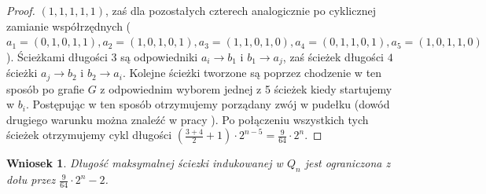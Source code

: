\documentclass{pracamgr}
\newtheorem{corollary}[theorem]{Wniosek}
\begin{document}
\begin{proof}
      $(1,1,1,1,1)$, zaś dla pozostałych czterech analogicznie po cyklicznej zamianie współrzędnych\newline
      ($a_1=(0,1,0,1,1),a_2=(1,0,1,0,1),a_3=(1,1,0,1,0),a_4=(0,1,1,0,1),a_5=(1,0,1,1,0)$).
      Ścieżkami długości $3$ są odpowiedniki $a_i\rightarrow b_1$ i $b_1\rightarrow a_j$, zaś ścieżek długości $4$ ścieżki
      $a_j\rightarrow b_2$ i $b_2\rightarrow a_i$. Kolejne ścieżki tworzone są poprzez chodzenie w ten sposób po grafie $G$ z odpowiednim
      wyborem jednej z 5 ścieżek kiedy startujemy w $b_i$.
      Postępując w ten sposób otrzymujemy porządany zwój w pudełku (dowód drugiego warunku można znaleźć w pracy \cite{Snake2}).
      Po połączeniu wszystkich tych ścieżek otrzymujemy cykl długości $(\frac{3+4}{2}+1)\cdot 2^{n-5}=\frac{9}{64}\cdot2^n$.
     \end{proof} 
     \begin{corollary}
      Długość maksymalnej ściezki indukowanej w $Q_n$ jest ograniczona z dołu przez $\frac{9}{64}\cdot 2^n-2$.
     \end{corollary}
\end{document}
